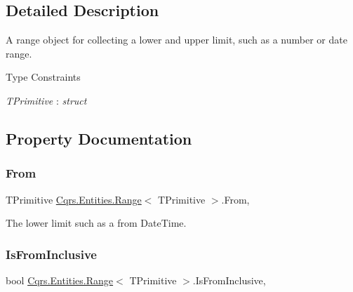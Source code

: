 \subsection{Detailed Description}
A range object for collecting a lower and upper limit, such as a number or date range. 

\begin{Desc}
\item[Type Constraints]\begin{description}
\item[{\em T\+Primitive} : {\em struct}]\end{description}
\end{Desc}


\subsection{Property Documentation}
\mbox{\label{classCqrs_1_1Entities_1_1Range_a373db08544a25cb6d53411f56e0e072a_a373db08544a25cb6d53411f56e0e072a}} 
\subsubsection{\texorpdfstring{From}{From}}
{\footnotesize\ttfamily T\+Primitive \hyperlink{classCqrs_1_1Entities_1_1Range}{Cqrs.\+Entities.\+Range}$<$ T\+Primitive $>$.From\hspace{0.3cm}{\ttfamily [get]}, {\ttfamily [set]}}



The lower limit such as a from Date\+Time. 

\mbox{\label{classCqrs_1_1Entities_1_1Range_a135f90a2f05344538e79a40b5da28378_a135f90a2f05344538e79a40b5da28378}} 
\subsubsection{\texorpdfstring{Is\+From\+Inclusive}{IsFromInclusive}}
{\footnotesize\ttfamily bool \hyperlink{classCqrs_1_1Entities_1_1Range}{Cqrs.\+Entities.\+Range}$<$ T\+Primitive $>$.Is\+From\+Inclusive\hspace{0.3cm}{\ttfamily [get]}, {\ttfamily [set]}}



